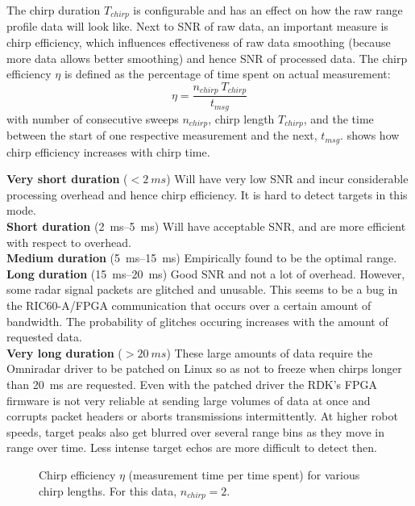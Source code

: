 The chirp duration \(T_{chirp}\) is configurable and has an effect on
how the raw range profile data will look like. Next to SNR of raw data, an important measure is chirp efficiency, which influences effectiveness of raw data smoothing (because more data allows better smoothing) and hence SNR of processed data. The chirp efficiency $\eta$ is defined as the percentage of time spent on actual measurement:
\begin{equation}
    \eta = \frac{n_{chirp}~T_{chirp}}{t_{msg}}
\end{equation}    
with number of consecutive sweeps \(n_{chirp}\), chirp
length \(T_{chirp}\), and the time between the start of one respective measurement and the next, \(t_{msg}\).  shows how chirp efficiency increases with chirp time. 

\textbf{Very short duration} (\(<\SI{2}{ms}\)) Will have very low SNR and incur considerable processing overhead and hence chirp efficiency. It is hard to detect targets in this mode.\\
\textbf{Short duration} (\SIrange{2}{5}{ms}) Will have acceptable SNR, and are more efficient with respect to overhead.\\
\textbf{Medium duration} (\SIrange{5}{15}{ms}) Empirically found to be the optimal range.\\
\textbf{Long duration} (\SIrange{15}{20}{ms}) Good SNR and not a lot of overhead. However, some radar signal packets are glitched and unusable. This seems to be a bug in the RIC60-A/FPGA communication that occurs over a certain amount of bandwidth. The probability of glitches occuring increases with the amount of requested data.\\
\textbf{Very long duration} (\(>\SI{20}{ms}\)) These large amounts of data require the Omniradar driver to be patched on Linux so as not to freeze when chirps longer than \SI{20}{ms} are requested. Even with the patched driver the RDK's FPGA firmware is not very reliable at sending large volumes of data at once and corrupts packet headers or aborts transmissions intermittently.
At higher robot speeds, target peaks also get blurred over several range bins as they move in range over time. Less intense target echos are more difficult to detect then.

\begin{figure}[htbp]
    \centering
    \def\svgwidth{10cm}
    
    \caption{Chirp efficiency \(\eta\) (measurement time per time spent) for various chirp lengths. For this data, $n_{chirp}=2$.}
    \label{fig:fig_chirp_eff}
\end{figure}

